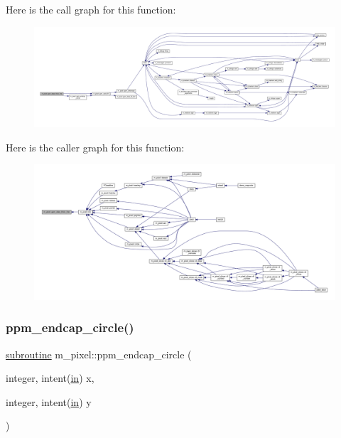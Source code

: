 Here is the call graph for this function\+:
\nopagebreak
\begin{figure}[H]
\begin{center}
\leavevmode
\includegraphics[width=350pt]{namespacem__pixel_a1629b7134d0ea4b0f301ca23df764b8e_cgraph}
\end{center}
\end{figure}
Here is the caller graph for this function\+:
\nopagebreak
\begin{figure}[H]
\begin{center}
\leavevmode
\includegraphics[width=350pt]{namespacem__pixel_a1629b7134d0ea4b0f301ca23df764b8e_icgraph}
\end{center}
\end{figure}
\mbox{\label{namespacem__pixel_aede24c612504a3e416840e6242c2d8fb}} 
\subsubsection{\texorpdfstring{ppm\+\_\+endcap\+\_\+circle()}{ppm\_endcap\_circle()}}
{\footnotesize\ttfamily \hyperlink{M__stopwatch_83_8txt_acfbcff50169d691ff02d4a123ed70482}{subroutine} m\+\_\+pixel\+::ppm\+\_\+endcap\+\_\+circle (\begin{DoxyParamCaption}\item[{integer, intent(\hyperlink{M__journal_83_8txt_afce72651d1eed785a2132bee863b2f38}{in})}]{x,  }\item[{integer, intent(\hyperlink{M__journal_83_8txt_afce72651d1eed785a2132bee863b2f38}{in})}]{y }\end{DoxyParamCaption})}



